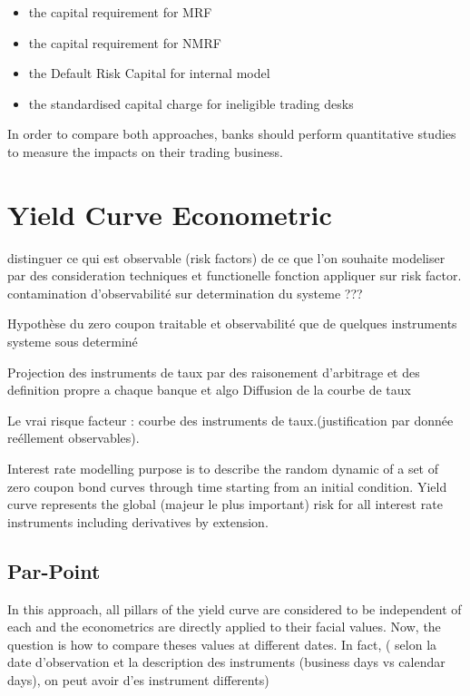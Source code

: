 \documentclass[10pt,a4paper]{report}
\begin{document}
\begin{itemize}
\item the capital requirement for MRF
\item the capital requirement for NMRF
\item the Default Risk Capital for internal model
\item the standardised capital charge for ineligible trading desks
\end{itemize}

\bigskip

In order to compare both approaches,  banks should perform quantitative studies to measure the impacts on their trading business.

\newpage
\section{Yield Curve Econometric}

\bigskip distinguer ce qui est observable (risk factors) de ce que l'on
souhaite modeliser par des consideration techniques et functionelle fonction
appliquer sur risk factor. contamination d'observabilit\'{e} 
sur determination du systeme ???

Hypoth\`{e}se du zero coupon traitable et observabilit\'{e} que de quelques
instruments  systeme sous determin\'{e}

Projection des instruments de taux par des raisonement d'arbitrage et des
definition propre a chaque banque et algo Diffusion de la courbe de taux

 Le vrai risque facteur : courbe des instruments de
taux.(justification par donn\'{e}e re\'{e}llement observables).

Interest rate modelling purpose is to describe the random dynamic of a set
of zero coupon bond curves through time starting from an initial condition.
Yield curve represents the global (majeur le plus important) risk for all
interest rate instruments including derivatives by extension.

\subsection{Par-Point}

In this approach, all pillars of the yield curve are considered to be independent of each
and the econometrics are directly applied to their facial values. Now, the
question is how to compare theses values at different dates. In fact, (
selon la date d'observation et la description des instruments (business days
vs calendar days), on peut avoir d'es instrument differents)
\end{document}
